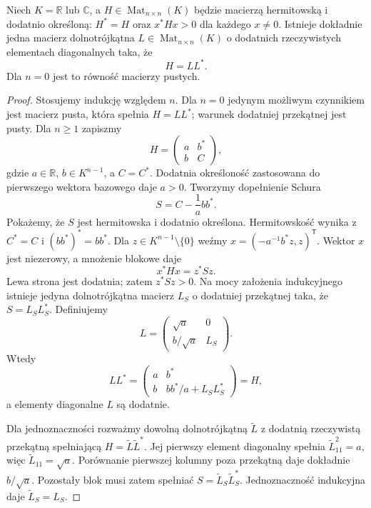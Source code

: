 \begin{twierdzenie}
\label{thm:lin15-cholesky}
Niech \(K=\mathbb R\) lub \(\mathbb C\),
a \(H\in\operatorname{Mat}_{n\times n}(K)\)
będzie macierzą hermitowską
i dodatnio określoną:
\(H^*=H\) oraz
\(x^*Hx>0\) dla każdego \(x\ne0\).
Istnieje dokładnie jedna
macierz dolnotrójkątna
\(L\in\operatorname{Mat}_{n\times n}(K)\)
o dodatnich rzeczywistych
elementach diagonalnych taka, że
\[
 H=LL^*.
\]
Dla \(n=0\) jest to równość
macierzy pustych.
\end{twierdzenie}
\begin{proof}
Stosujemy indukcję względem \(n\).
Dla \(n=0\) jedynym możliwym czynnikiem
jest macierz pusta, która spełnia \(H=LL^*\);
warunek dodatniej przekątnej jest pusty.
Dla \(n\ge1\) zapiszmy
\[
 H=\begin{pmatrix}a&b^*\\b&C\end{pmatrix},
\]
gdzie \(a\in\mathbb R\),
\(b\in K^{n-1}\),
a \(C=C^*\).
Dodatnia określoność zastosowana
do pierwszego wektora bazowego
daje \(a>0\).
Tworzymy dopełnienie Schura
\[
 S=C-\frac1a bb^*.
\]
Pokażemy, że \(S\)
jest hermitowska i dodatnio określona.
Hermitowskość wynika z
\(C^*=C\) i \((bb^*)^*=bb^*\).
Dla \(z\in K^{n-1}\setminus\{0\}\)
weźmy
\(x=(-a^{-1}b^*z,z)^{\mathsf T}\).
Wektor \(x\) jest niezerowy,
a mnożenie blokowe daje
\[
 x^*Hx=z^*Sz.
\]
Lewa strona jest dodatnia;
zatem \(z^*Sz>0\).
Na mocy założenia indukcyjnego
istnieje jedyna dolnotrójkątna
macierz \(L_S\) o dodatniej
przekątnej taka, że
\(S=L_SL_S^*\).
Definiujemy
\[
 L=\begin{pmatrix}
 \sqrt a&0\\
 b/\sqrt a&L_S
 \end{pmatrix}.
\]
Wtedy
\[
 LL^*=
 \begin{pmatrix}
 a&b^*\\b&bb^*/a+L_SL_S^*
 \end{pmatrix}
 =H,
\]
a elementy diagonalne \(L\)
są dodatnie.

Dla jednoznaczności rozważmy
dowolną dolnotrójkątną
\(\widetilde L\) z dodatnią
rzeczywistą przekątną
spełniającą
\(H=\widetilde L\widetilde L^*\).
Jej pierwszy element diagonalny
spełnia \(\widetilde L_{11}^2=a\),
więc \(\widetilde L_{11}=\sqrt a\).
Porównanie pierwszej kolumny
poza przekątną daje dokładnie
\(b/\sqrt a\). Pozostały blok
musi zatem spełniać
\(S=\widetilde L_S\widetilde L_S^*\).
Jednoznaczność indukcyjna
daje \(\widetilde L_S=L_S\).
\end{proof}


